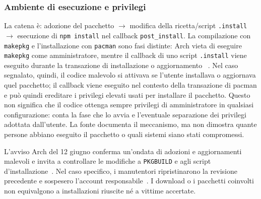 \subsubsection{Ambiente di esecuzione e privilegi}
La catena è: adozione del pacchetto $\rightarrow$ modifica della ricetta/script
\texttt{.install} $\rightarrow$ esecuzione di \texttt{npm install} nel callback
\texttt{post\_install}. La compilazione con \texttt{makepkg} e l'installazione
con \texttt{pacman} sono fasi distinte: Arch vieta di eseguire \texttt{makepkg}
come amministratore, mentre il callback di uno script \texttt{.install} viene
eseguito durante la transazione di installazione o aggiornamento
~\cite{archwiki-makepkg,arch-alpm-scriptlet}. Nel caso segnalato, quindi, il
codice malevolo si attivava se l'utente installava o aggiornava quel pacchetto;
il callback viene eseguito nel contesto della transazione di pacman e può
quindi ereditare i privilegi elevati usati per installare il pacchetto. Questo
non significa che il codice ottenga sempre privilegi di amministratore in
qualsiasi configurazione: conta la fase che lo avvia e l'eventuale separazione
dei privilegi adottata dall'utente. La fonte documenta il meccanismo, ma non
dimostra quante persone abbiano eseguito il pacchetto o quali sistemi siano
stati compromessi.

L'avviso Arch del 12 giugno conferma un'ondata di adozioni e aggiornamenti
malevoli e invita a controllare le modifiche a \texttt{PKGBUILD} e agli script
d'installazione~\cite{arch-aur-incident-2026}. Nel caso specifico, i
manutentori ripristinarono la revisione precedente e sospesero l'account
responsabile~\cite{aur-mail-gnome-randr}. I download o i pacchetti coinvolti
non equivalgono a installazioni riuscite né a vittime accertate.
